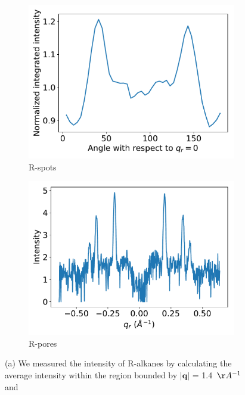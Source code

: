\documentclass[journal=jpcbfk,manuscript=article]{achemso}
\begin{document}
\begin{figure}[!htb]
  \begin{subfigure}{0.45\linewidth}
  \centering
  \includegraphics[width=\textwidth]{angular_integration.pdf} %
  \caption{R-spots}\label{fig:rspots}
  \end{subfigure}
  \begin{subfigure}{0.45\linewidth}
  \centering
  \includegraphics[width=\textwidth]{saxs_xsection.pdf}  %
  \caption{R-pores}\label{fig:saxs_xsection}
  \end{subfigure}
  \caption{(a) We measured the intensity of R-alkanes by calculating the average 
  intensity within the region bounded by $|\mathbf{q}|$ = 1.4~$\AA^{-1}$ and 
}
\end{figure}
\end{document}
